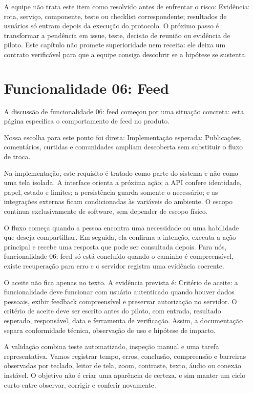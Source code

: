 \documentclass[12pt,oneside,a4paper,article]{abntex2}
\begin{document}
A equipe não trata este item como resolvido antes de enfrentar o risco: Evidência: rota, serviço, componente, teste ou checklist correspondente; resultados de usuários só entram depois da execução do protocolo. O próximo passo é transformar a pendência em issue, teste, decisão de reunião ou evidência de piloto. Este capítulo não promete superioridade nem receita: ele deixa um contrato verificável para que a equipe consiga descobrir se a hipótese se sustenta.

\section{Funcionalidade 06: Feed}
A discussão de funcionalidade 06: feed começou por uma situação concreta: esta página especifica o comportamento de feed no produto.

Nossa escolha para este ponto foi direta: Implementação esperada: Publicações, comentários, curtidas e comunidades ampliam descoberta sem substituir o fluxo de troca.

Na implementação, este requisito é tratado como parte do sistema e não como uma tela isolada. A interface orienta a próxima ação; a API confere identidade, papel, estado e limites; a persistência guarda somente o necessário; e as integrações externas ficam condicionadas às variáveis do ambiente. O escopo continua exclusivamente de software, sem depender de escopo físico.

O fluxo começa quando a pessoa encontra uma necessidade ou uma habilidade que deseja compartilhar. Em seguida, ela confirma a intenção, executa a ação principal e recebe uma resposta que pode ser consultada depois. Para nós, funcionalidade 06: feed só está concluído quando o caminho é compreensível, existe recuperação para erro e o servidor registra uma evidência coerente.

O aceite não fica apenas no texto. A evidência prevista é: Critério de aceite: a funcionalidade deve funcionar com usuário autenticado quando houver dados pessoais, exibir feedback compreensível e preservar autorização no servidor. O critério de aceite deve ser escrito antes do piloto, com entrada, resultado esperado, responsável, data e ferramenta de verificação. Assim, a documentação separa conformidade técnica, observação de uso e hipótese de impacto.

A validação combina teste automatizado, inspeção manual e uma tarefa representativa. Vamos registrar tempo, erros, conclusão, compreensão e barreiras observadas por teclado, leitor de tela, zoom, contraste, texto, áudio ou conexão instável. O objetivo não é criar uma aparência de certeza, e sim manter um ciclo curto entre observar, corrigir e conferir novamente.
\end{document}
